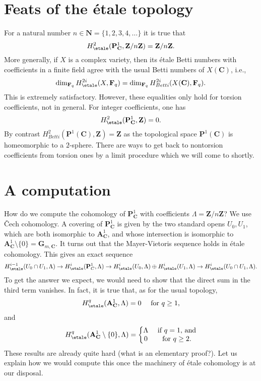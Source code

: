\section{Feats of the \'etale topology}
\label{section-feats}

\noindent
For a natural number $n \in \mathbf{N} = \{1, 2, 3, 4, \ldots\}$ it is true that
$$
H_\etale^2 (\mathbf{P}^1_\mathbf{C}, \mathbf{Z}/n\mathbf{Z}) =
\mathbf{Z}/n\mathbf{Z}.
$$
More generally, if $X$ is a complex variety, then its \'etale Betti numbers
with coefficients in a finite field agree with the usual Betti numbers of
$X(\mathbf{C})$, i.e.,
$$
\dim_{\mathbf{F}_q} H_\etale^{2i} (X, \mathbf{F}_q) =
\dim_{\mathbf{F}_q} H_{Betti}^{2i} (X(\mathbf{C}), \mathbf{F}_q).
$$
This is extremely satisfactory. However, these equalities only hold for torsion
coefficients, not in general. For integer coefficients, one has
$$
H_\etale^2 (\mathbf{P}^1_\mathbf{C}, \mathbf{Z}) = 0.
$$
By contrast $H_{Betti}^2(\mathbf{P}^1(\mathbf{C}), \mathbf{Z}) = \mathbf{Z}$
as the topological space $\mathbf{P}^1(\mathbf{C})$ is homeomorphic to
a $2$-sphere.
There are ways to get back to nontorsion coefficients from torsion ones by a
limit procedure which we will come to shortly.




\section{A computation}
\label{section-computation}

\noindent
How do we compute the cohomology of $\mathbf{P}^1_\mathbf{C}$ with coefficients
$\Lambda = \mathbf{Z}/n\mathbf{Z}$?
We use {\v C}ech cohomology. A covering of $\mathbf{P}^1_\mathbf{C}$ is given
by the two standard opens $U_0, U_1$, which are both
isomorphic to $\mathbf{A}^1_\mathbf{C}$, and whose intersection is isomorphic
to $\mathbf{A}^1_\mathbf{C} \setminus \{0\} = \mathbf{G}_{m, \mathbf{C}}$.
It turns out that the Mayer-Vietoris sequence holds in \'etale cohomology.
This gives an exact sequence
$$
H_\etale^{i-1}(U_0\cap U_1, \Lambda) \to
H_\etale^i(\mathbf{P}^1_C, \Lambda) \to
H_\etale^i(U_0, \Lambda) \oplus
H_\etale^i(U_1, \Lambda) \to H_\etale^i(U_0\cap U_1,
\Lambda).
$$
To get the answer we expect, we would need to show that the direct sum in the
third term vanishes. In fact, it is true that, as for the usual topology,
$$
H_\etale^q (\mathbf{A}^1_\mathbf{C}, \Lambda) = 0
\quad \text{ for } q \geq 1,
$$
and
$$
H_\etale^q (\mathbf{A}^1_\mathbf{C} \setminus \{0\}, \Lambda) = \left\{
\begin{matrix}
\Lambda & \text{ if }q = 1\text{, and} \\
0 & \text{ for }q \geq 2.
\end{matrix}
\right.
$$
These results are already quite hard (what is an elementary proof?). Let us
explain how we would compute this once the machinery of \'etale cohomology is
at our disposal.

